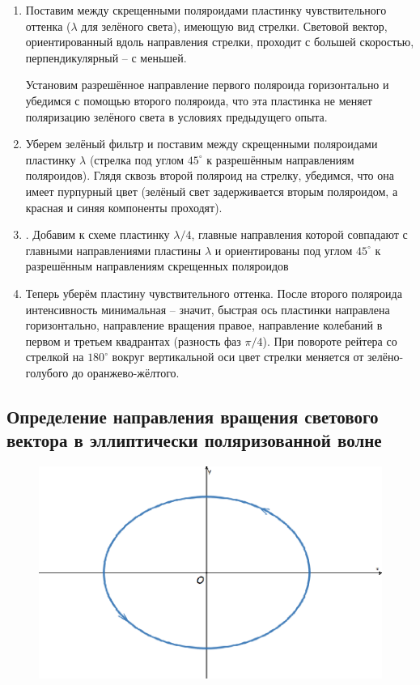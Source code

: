 	\begin{enumerate}
		\item Поставим между скрещенными поляроидами пластинку чувствительного оттенка ($\lambda$ для зелёного света), имеющую вид стрелки. Световой вектор, ориентированный вдоль направления стрелки, проходит с большей скоростью, перпендикулярный -- с меньшей.
		
		Установим разрешённое направление первого поляроида горизонтально и убедимся с помощью второго поляроида, что эта пластинка
		не меняет поляризацию зелёного света в условиях предыдущего опыта.
		
		\item Уберем зелёный фильтр и поставим между скрещенными поляроидами
		пластинку $\lambda$ (стрелка под углом $45^{\circ}$ к разрешённым направлениям поляроидов). Глядя сквозь второй поляроид на стрелку, убедимся, что она имеет пурпурный цвет (зелёный свет задерживается вторым поляроидом, а красная и синяя компоненты проходят).
		
		\item . Добавим к схеме пластинку $\lambda/4$, главные направления
		которой совпадают с главными направлениями пластины $\lambda$ и ориентированы под углом $45^{\circ}$ к разрешённым направлениям скрещенных поляроидов
		
		\item Теперь уберём пластину чувствительного оттенка. После второго поляроида интенсивность минимальная -- значит, быстрая ось пластинки направлена горизонтально, направление вращения правое, направление колебаний в первом и третьем квадрантах (разность фаз $\pi/4$). При повороте рейтера со стрелкой на $180^{\circ}$ вокруг вертикальной оси
		цвет стрелки меняется от зелёно-голубого до оранжево-жёлтого.
		
	\end{enumerate}
	
	\subsection*{Определение направления вращения светового вектора в эллиптически поляризованной волне}
	
	\begin{figure}
		\centering
		\includegraphics[width=0.5\textheight]{./images/Эллипс.png}
		\caption{}
	\end{figure}
	
